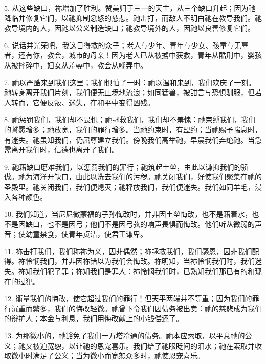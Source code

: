 5. 从这些缺口，祢增加了胜利。赞美归于三一的天主，从三个缺口升起；因为祂降临并修复它们，以祂抑制忿怒的慈悲。祂击打，而敌人不明白祂在教导我们。祂教导境内的人，因祂以公义制造缺口；祂教导境外的人，因祂以良善修复它们。\par

6. 说话并光荣吧，我这日得救的众子；老人与少年、青年与少女、孩童与无辜者，还有你，教会，城市的母亲！因为老人已从被掳中获救，青年从酷刑中，婴孩从被摔碎中，妇女从羞辱中，教会从嘲弄中。\par

7. 祂以严酷来到我们这里；我们惧怕了一时：祂以温和来到，我们欢庆了一刻。祂转身离开我们片刻，我们便无止境地流浪；如同猛兽，被甜言与恐惧驯服，但若人转而，它便反叛、迷失，在和平中变得凶残。\par

8. 祂惩罚我们，我们却不畏惧；祂拯救我们，我们却不羞愧：祂束缚我们，我们的誓愿增多；祂放宽，我们的罪行增多。当祂约束时，有盟约；当祂赐予喘息时，有迷失。祂虽知我们，仍屈尊建立我们。傍晚我们高举祂，早晨我们弃绝祂。当急需离开我们时，信德也离开了我们。\par

9. 祂藉缺口磨难我们，以惩罚我们的罪行；祂筑起土垒，由此以谦抑我们的骄傲。祂为海洋开缺口，由此以洗去我们的污秽。祂关闭我们，好使我们聚集在祂的圣殿里。祂关闭我们，我们便熄灭；祂释放我们，我们便迷失。我们如同羊毛，浸入各种颜色。\par

10. 我们知道，当尼尼微蒙福的子孙悔改时，并非因土垒悔改，也不是藉着水，也不是因缺口，也不是因弓；他们不是因弓弦的响声畏惧而悔改。他们听从微弱的声音；使幼童禁食，使青年贞洁，使君王谦卑。\par

11. 祢击打我们，我们称祢为义，因非偶然；祢拯救我们，我们感恩，因非我们配得。祢怜悯我们，并非因祢错以为我们会悔改。祢明知，当祢怜悯我们时，我们迷失。祢知我们犯了罪；祢知我们是罪人：祢怜悯我们时，已熟知我们那已有的和现在的过犯。\par

12. 衡量我们的悔改，使它超过我们的罪行！但天平两端并不等重；因为我们的罪行沉重而繁多，我们的悔改轻微。祂曾下令我们因债务被出卖：祂的慈悲成为我们的辩护人；本金与利息，我们用悔改献上的小钱偿还了。\par

13. 为那微小的，祂豁免了我们一万塔冷通的债务。祂本应索取，以平息祂的公义；祂又被迫宽恕，以让祂的恩宠喜乐。我们给了祂眼眨间的泪水；祂在索取并收取微小时满足了公义；当为微小而宽恕众多时，祂使恩宠喜乐。\par

